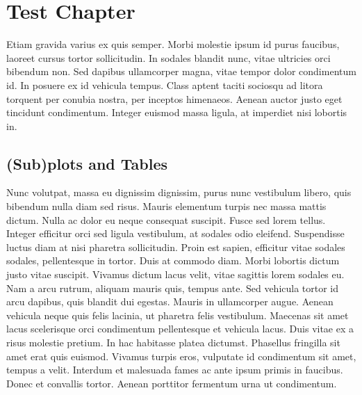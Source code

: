 
\section{Test Chapter}
Etiam gravida varius ex quis semper. Morbi molestie ipsum id purus faucibus, laoreet cursus tortor sollicitudin. In sodales blandit nunc, vitae ultricies orci bibendum non. Sed dapibus ullamcorper magna, vitae tempor dolor condimentum id. In posuere ex id vehicula tempus. Class aptent taciti sociosqu ad litora torquent per conubia nostra, per inceptos himenaeos. Aenean auctor justo eget tincidunt condimentum. Integer euismod massa ligula, at imperdiet nisi lobortis in.

\subsection{(Sub)plots and Tables}
Nunc volutpat, massa eu dignissim dignissim, purus nunc vestibulum libero, quis bibendum nulla diam sed risus. Mauris elementum turpis nec massa mattis dictum. Nulla ac dolor eu neque consequat suscipit. Fusce sed lorem tellus. Integer efficitur orci sed ligula vestibulum, at sodales odio eleifend. Suspendisse luctus diam at nisi pharetra sollicitudin. Proin est sapien, efficitur vitae sodales sodales, pellentesque in tortor. Duis at commodo diam. Morbi lobortis dictum justo vitae suscipit. Vivamus dictum lacus velit, vitae sagittis lorem sodales eu. Nam a arcu rutrum, aliquam mauris quis, tempus ante. Sed vehicula tortor id arcu dapibus, quis blandit dui egestas. Mauris in ullamcorper augue.
Aenean vehicula neque quis felis lacinia, ut pharetra felis vestibulum. Maecenas sit amet lacus scelerisque orci condimentum pellentesque et vehicula lacus. Duis vitae ex a risus molestie pretium. In hac habitasse platea dictumst. Phasellus fringilla sit amet erat quis euismod. Vivamus turpis eros, vulputate id condimentum sit amet, tempus a velit. Interdum et malesuada fames ac ante ipsum primis in faucibus. Donec et convallis tortor. Aenean porttitor fermentum urna ut condimentum.

